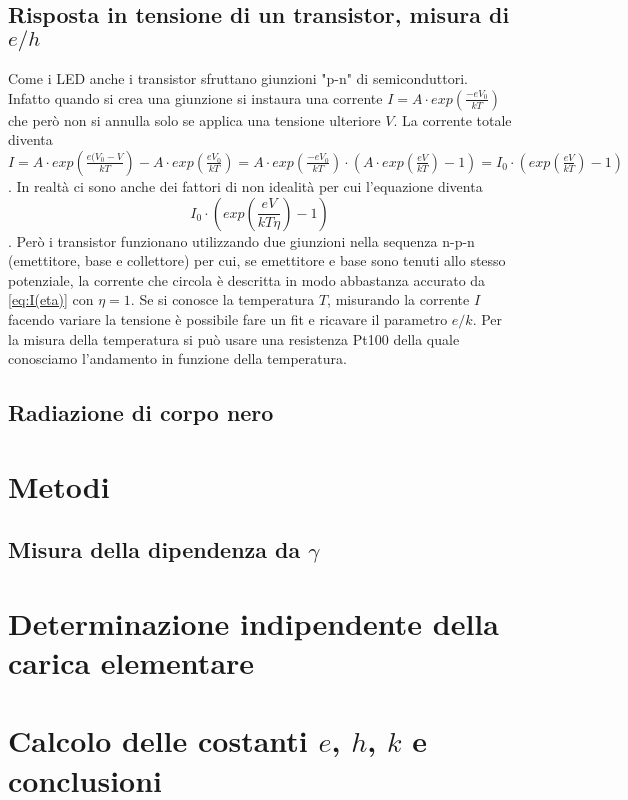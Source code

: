 \documentclass[a4paper, varvw, nofootinbib]{revtex4-2}
\begin{document}
\subsection{Risposta in tensione di un transistor, misura di $e/h$}

Come i LED anche i transistor sfruttano giunzioni "p-n" di semiconduttori. Infatto quando si crea una giunzione si instaura una corrente $I=A\cdot exp(\frac{-eV_0}{kT})$ che però non si annulla solo se applica una tensione ulteriore $V$. La corrente totale diventa $I=A\cdot exp(\frac{e(V_0-V}{kT})-A\cdot exp(\frac{eV_0}{kT}) = A\cdot exp(\frac{-eV_0}{kT})\cdot(A\cdot exp(\frac{eV}{kT})-1) = I_0\cdot(exp(\frac{eV}{kT})-1)$. In realtà ci sono anche dei fattori di non idealità per cui l'equazione diventa \begin{equation}  I_0\cdot(exp(\frac{eV}{kT\eta})-1)\label{eq:I(eta)} \end{equation}. Però i transistor funzionano utilizzando due giunzioni nella sequenza n-p-n (emettitore, base e collettore) per cui, se emettitore e base sono tenuti allo stesso potenziale, la corrente che circola è descritta in modo abbastanza accurato da \ref{eq:I(eta)} con $\eta=1$. Se si conosce la temperatura $T$, misurando la corrente $I$ facendo variare la tensione è possibile fare un fit e ricavare il parametro $e/k$. Per la misura della temperatura si può usare una resistenza Pt100 della quale conosciamo l'andamento in funzione della temperatura. 

\subsection{Radiazione di corpo nero}

\section{Metodi}\label{sec:black_body_methods}

\subsection{Misura della dipendenza da $\gamma$}

\section{Determinazione indipendente della carica elementare}\label{sec:millikan}

\section{Calcolo delle costanti $e$, $h$, $k$ e conclusioni}\label{sec:combined_data}


\end{document}
